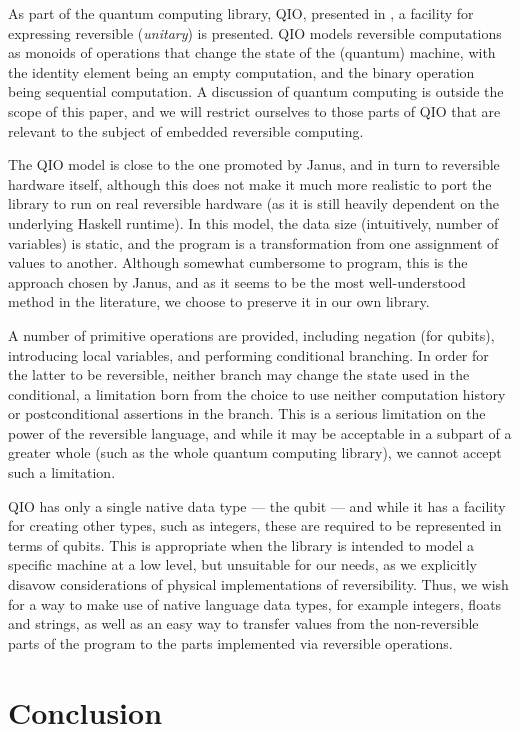\documentclass[10pt]{sigplanconf}
\begin{document}
As part of the quantum computing library, QIO, presented in
\cite{altenkirchquantum}, a facility for expressing reversible
(\textit{unitary}) is presented.  QIO models reversible computations
as monoids of operations that change the state of the (quantum)
machine, with the identity element being an empty computation, and the
binary operation being sequential computation.  A discussion of
quantum computing is outside the scope of this paper, and we will
restrict ourselves to those parts of QIO that are relevant to the
subject of embedded reversible computing.

The QIO model is close to the one promoted by Janus, and in turn to
reversible hardware itself, although this does not make it much more
realistic to port the library to run on real reversible hardware (as
it is still heavily dependent on the underlying Haskell runtime).  In
this model, the data size (intuitively, number of variables) is
static, and the program is a transformation from one assignment of
values to another.  Although somewhat cumbersome to program, this is
the approach chosen by Janus, and as it seems to be the most
well-understood method in the literature, we choose to preserve it in
our own library.

A number of primitive operations are provided, including negation (for
qubits), introducing local variables, and performing conditional
branching.  In order for the latter to be reversible, neither branch
may change the state used in the conditional, a limitation born from
the choice to use neither computation history or postconditional
assertions in the branch.  This is a serious limitation on the power
of the reversible language, and while it may be acceptable in a
subpart of a greater whole (such as the whole quantum computing
library), we cannot accept such a limitation.

QIO has only a single native data type --- the qubit --- and while it
has a facility for creating other types, such as integers, these are
required to be represented in terms of qubits.  This is appropriate
when the library is intended to model a specific machine at a low
level, but unsuitable for our needs, as we explicitly disavow
considerations of physical implementations of reversibility.  Thus, we
wish for a way to make use of native language data types, for example
integers, floats and strings, as well as an easy way to transfer
values from the non-reversible parts of the program to the parts
implemented via reversible operations.

\section{Conclusion}
\end{document}
